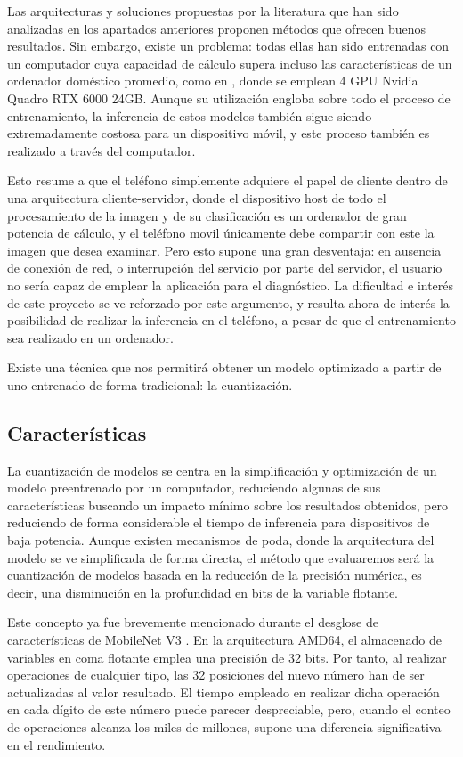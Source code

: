 Las arquitecturas y soluciones propuestas por la literatura que han sido analizadas en los apartados anteriores proponen métodos que ofrecen buenos resultados. Sin embargo, existe un problema: todas ellas han sido entrenadas con un computador cuya capacidad de cálculo supera incluso las características de un ordenador doméstico promedio, como en \cite{2ndISIC}, donde se emplean 4  GPU Nvidia Quadro RTX 6000 24GB. Aunque su utilización engloba sobre todo el proceso de entrenamiento, la inferencia de estos modelos también sigue siendo extremadamente costosa para un dispositivo móvil, y este proceso también es realizado a través del computador.

Esto resume a que el teléfono simplemente adquiere el papel de cliente dentro de una arquitectura cliente-servidor, donde el dispositivo host de todo el procesamiento de la imagen y de su clasificación es un ordenador de gran potencia de cálculo, y el teléfono movil únicamente debe compartir con este la imagen que desea examinar. Pero esto supone una gran desventaja: en ausencia de conexión de red, o interrupción del servicio por parte del servidor, el usuario no sería capaz de emplear la aplicación para el diagnóstico. La dificultad e interés de este proyecto se ve reforzado por este argumento, y resulta ahora de interés la posibilidad de realizar la inferencia en el teléfono, a pesar de que el entrenamiento sea realizado en un ordenador.

Existe una técnica que nos permitirá obtener un modelo optimizado a partir de uno entrenado de forma tradicional: la cuantización.

\subsection{Características}

La cuantización de modelos se centra en la simplificación y optimización de un modelo preentrenado por un computador, reduciendo algunas de sus características buscando un impacto mínimo sobre los resultados obtenidos, pero reduciendo de forma considerable el tiempo de inferencia para dispositivos de baja potencia. Aunque existen mecanismos de poda, donde la arquitectura del modelo se ve simplificada de forma directa, el método que evaluaremos será la cuantización de modelos basada en la reducción de la precisión numérica, es decir, una disminución en la profundidad en bits de la variable flotante.

Este concepto ya fue brevemente mencionado durante el desglose de características de MobileNet V3 \cite{howard2019searching}. En la arquitectura AMD64, el almacenado de variables en coma flotante emplea una precisión de 32 bits. Por tanto, al realizar operaciones de cualquier tipo, las 32 posiciones del nuevo número han de ser actualizadas al valor resultado. El tiempo empleado en realizar dicha operación en cada dígito de este número puede parecer despreciable, pero, cuando el conteo de operaciones alcanza los miles de millones, supone una diferencia significativa en el rendimiento. 

